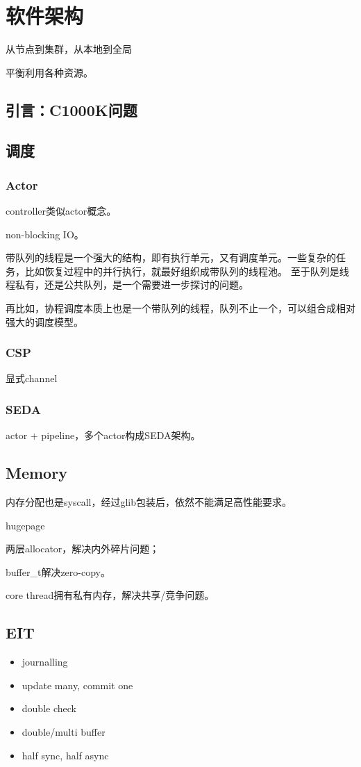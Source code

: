 \chapter{软件架构}

从节点到集群，从本地到全局

平衡利用各种资源。

\section{引言：C1000K问题}

\section{调度}

\subsection{Actor}

controller类似actor概念。

non-blocking IO。

带队列的线程是一个强大的结构，即有执行单元，又有调度单元。一些复杂的任务，比如恢复过程中的并行执行，就最好组织成带队列的线程池。
至于队列是线程私有，还是公共队列，是一个需要进一步探讨的问题。

再比如，协程调度本质上也是一个带队列的线程，队列不止一个，可以组合成相对强大的调度模型。

\subsection{CSP}

显式channel

\subsection{SEDA}

actor + pipeline，多个actor构成SEDA架构。

\section{Memory}

内存分配也是syscall，经过glib包装后，依然不能满足高性能要求。

\begin{enumbox}
\item hugepage
\item 两层allocator，解决内外碎片问题；
\item buffer\_t解决zero-copy。
\item core thread拥有私有内存，解决共享/竞争问题。
\end{enumbox}

\section{EIT}

\begin{itemize}
    \item journalling
    \item update many, commit one
    \item double check
    \item double/multi buffer
    \item half sync, half async
\end{itemize}
